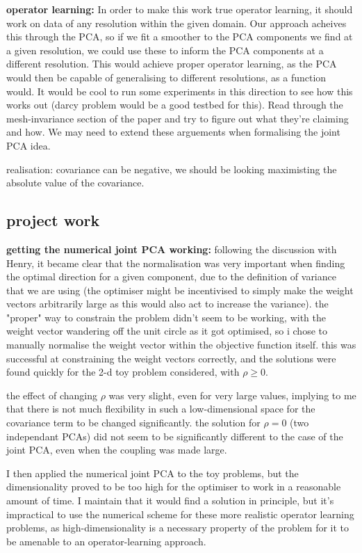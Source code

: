 \documentclass[11pt,a4paper]{article}
\begin{document}
\textbf{operator learning:}
In order to make this work true operator learning, it should work on data of any resolution within the given domain.
Our approach acheives this through the PCA, so if we fit a smoother to the PCA components we find at a given resolution, we could use these to inform the PCA components at a different resolution.
This would achieve proper operator learning, as the PCA would then be capable of generalising to different resolutions, as a function would.
It would be cool to run some experiments in this direction to see how this works out (darcy problem would be a good testbed for this).
Read through the mesh-invariance section of the paper and try to figure out what they're claiming and how.
We may need to extend these arguements when formalising the joint PCA idea.

realisation: covariance can be negative, we should be looking maximisting the absolute value of the covariance.

\subsection{project work}

\textbf{getting the numerical joint PCA working:}
following the discussion with Henry, it became clear that the normalisation was very important when finding the optimal direction for a given component, due to the definition of variance that we are using (the optimiser might be incentivised to simply make the weight vectors arbitrarily large as this would also act to increase the variance).
the "proper" way to constrain the problem didn't seem to be working, with the weight vector wandering off the unit circle as it got optimised, so i chose to manually normalise the weight vector within the objective function itself.
this was successful at constraining the weight vectors correctly, and the solutions were found quickly for the 2-d toy problem considered, with $\rho \geq 0$.

the effect of changing $\rho$ was very slight, even for very large values, implying to me that there is not much flexibility in such a low-dimensional space for the covariance term to be changed significantly.
the solution for $\rho = 0$ (two independant PCAs) did not seem to be significantly different to the case of the joint PCA, even when the coupling was made large.

I then applied the numerical joint PCA to the toy problems, but the dimensionality proved to be too high for the optimiser to work in a reasonable amount of time. 
I maintain that it would find a solution in principle, but it's impractical to use the numerical scheme for these more realistic operator learning problems, as high-dimensionality is a necessary property of the problem for it to be amenable to an operator-learning approach.
\end{document}
